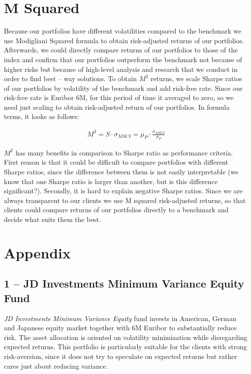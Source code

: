 \documentclass[11pt, parskip=full, DIV=14]{scrreprt}
\begin{document}
\chapter{M Squared}
Because our portfolios have different volatilities compared to the benchmark we use Modigliani Squared formula to obtain risk-adjusted returns of our portfolios. Afterwards, we could directly compare returns of our portfolios to those of the index and confirm that our portfolios outperform the benchmark not because of higher risks but because of high-level analysis and research that we conduct in order to find best – way solutions. To obtain $M^2$ returns, we scale Sharpe ratios of our portfolios by volatility of the benchmark and add risk-free rate. Since our risk-free rate is Euribor 6M, for this period of time it averaged to zero, so we need just scaling to obtain risk-adjusted return of our portfolios. In formula terms, it looks as follows:

\begin{align*}
  M^2 = S \cdot \sigma_{MSCI} = \mu_P \cdot \frac{\sigma_{MSCI}}{\sigma_P}
\end{align*}

$M^2$ has many benefits in comparison to Sharpe ratio as performance criteria.  First reason is that it could be difficult to compare portfolios with different Sharpe ratios, since the difference between them is not easily interpretable (we know that one Sharpe ratio is larger than another, but is this difference significant?). Secondly, it is hard to explain negative Sharpe ratios. Since we are always transparent to our clients we use M squared risk-adjusted returns, so that clients could compare returns of our portfolios directly to a benchmark and decide what suits them the best.


\newpage
\chapter{Appendix}
\section*{1 -- JD Investments Minimum Variance Equity Fund}
\textit{JD Investments Minimum Variance Equity} fund invests in American, German and Japanese equity market together with 6M Euribor to substantially reduce risk.
The asset allocation is oriented on volatility minimization while disregarding expected returns.
This portfolio is particularly suitable for the clients with strong risk-aversion, since it does not try to speculate on expected returns but rather cares just about reducing variance.
\end{document}
